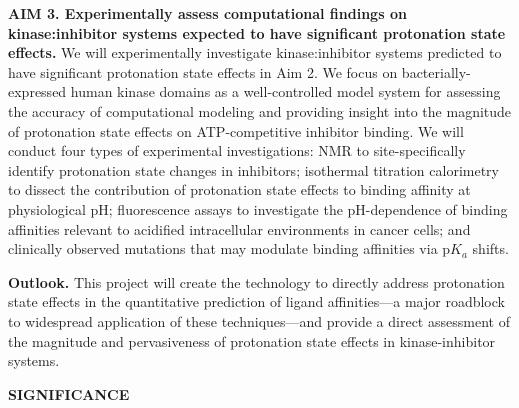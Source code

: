 \documentclass[11pt]{article}
\begin{document}
{\bf AIM 3. Experimentally assess computational findings on kinase:inhibitor systems expected to have significant protonation state effects.}
We will experimentally investigate kinase:inhibitor systems predicted to have significant protonation state effects in Aim 2.
We focus on bacterially-expressed human kinase domains as a well-controlled model system for assessing the accuracy of computational modeling and providing insight into the magnitude of protonation state effects on ATP-competitive inhibitor binding.
We will conduct four types of experimental investigations: NMR to site-specifically identify protonation state changes in inhibitors; isothermal titration calorimetry to dissect the contribution of protonation state effects to binding affinity at physiological pH; fluorescence assays to investigate the pH-dependence of binding affinities relevant to acidified intracellular environments in cancer cells; and clinically observed mutations that may modulate binding affinities via p$K_a$ shifts. 

{\bf Outlook.} This project will create the technology to directly address protonation state effects in the quantitative prediction of ligand affinities---a major roadblock to widespread application of these techniques---and provide a direct assessment of the magnitude and pervasiveness of protonation state effects in kinase-inhibitor systems.

\eject


{\large \bf SIGNIFICANCE}
\end{document}
